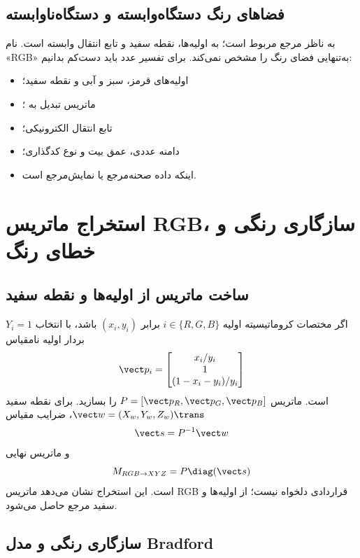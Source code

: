\subsection{فضاهای رنگ دستگاه‌وابسته و دستگاه‌ناوابسته}

 به ناظر مرجع مربوط است؛  به اولیه‌ها، نقطه سفید و تابع انتقال وابسته است.
نام «RGB» به‌تنهایی فضای رنگ را مشخص نمی‌کند. برای تفسیر عدد باید دست‌کم بدانیم:
\begin{itemize}
\item اولیه‌های قرمز، سبز و آبی و نقطه سفید؛
\item ماتریس تبدیل به ؛
\item تابع انتقال الکترونیکی؛
\item دامنه عددی، عمق بیت و نوع کدگذاری؛
\item اینکه داده صحنه‌مرجع یا نمایش‌مرجع است.
\end{itemize}


\section{استخراج ماتریس RGB، سازگاری رنگی و خطای رنگ}

\subsection{ساخت ماتریس از اولیه‌ها و نقطه سفید}

اگر مختصات کروماتیسیته اولیه \(i\in\{R,G,B\}\) برابر \((x_i,y_i)\) باشد، با انتخاب
\(Y_i=1\) بردار اولیه نامقیاس
\begin{equation}
\vect p_i=\begin{bmatrix}x_i/y_i\\1\\(1-x_i-y_i)/y_i\end{bmatrix}
\end{equation}
است. ماتریس \(P=[\vect p_R,\vect p_G,\vect p_B]\) را بسازید. برای نقطه سفید
\(\vect w=(X_w,Y_w,Z_w)\trans\)، ضرایب مقیاس
\begin{equation}
\vect s=P^{-1}\vect w
\end{equation}
و ماتریس نهایی
\begin{equation}
M_{RGB\to XYZ}=P\diag(\vect s)
\label{eq:rgbxyz-from-primaries}
\end{equation}
است. این استخراج نشان می‌دهد ماتریس RGB قراردادی دلخواه نیست؛ از اولیه‌ها و سفید مرجع حاصل می‌شود.

\subsection{سازگاری رنگی و مدل Bradford}

